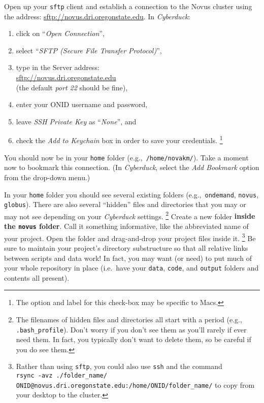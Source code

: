 \documentclass[12pt,letterpaper]{article}
\begin{document}
Open up your \texttt{sftp} client and establish a connection to the Novus cluster using the address:
\url{sftp://novus.dri.oregonstate.edu}.
In \emph{Cyberduck}:
\begin{enumerate}
	\item click on ``\emph{Open Connection}'',
	\item select ``\emph{SFTP (Secure File Transfer Protocol)}'',
	\item type in the Server address:\\
	\url{sftp://novus.dri.oregonstate.edu}\\
	(the default \emph{port 22} should be fine),
	\item enter your ONID username and password,
	\item leave \emph{SSH Private Key} as ``\emph{None}'', and
	\item check the \emph{Add to Keychain} box in order to save your credentials.
	\unskip\footnote{The option and label for this check-box may be specific to Macs.}
\end{enumerate}
\noindent
You should now be in your \texttt{home} folder (e.g.,~\texttt{/home/novakm/}).
Take a moment now to bookmark this connection.
(In \emph{Cyberduck}, select the \emph{Add Bookmark} option from the drop-down menu.)

In your \texttt{home} folder you should see several existing folders (e.g.,~\texttt{ondemand}, \texttt{novus}, \texttt{globus}).
There are also several ``hidden'' files and directories that you may or may not see depending on your \textit{Cyberduck} settings.
\unskip
\footnote{The filenames of hidden files and directories all start with a period (e.g., \texttt{.bash\_profile}).
Don't worry if you don't see them as you'll rarely if ever need them.  
In fact, you typically don't want to delete them, so be careful if you do see them.}
Create a new folder \textbf{inside the \texttt{novus} folder}.
Call it something informative, like the abbreviated name of your project.
Open the folder and drag-and-drop your project files inside it.
\unskip
\footnote{Rather than using \texttt{sftp}, 
	you could also use \texttt{ssh} and the command \\
		\texttt{rsync -avz ./{folder\_name}/ ONID@novus.dri.oregonstate.edu:/home/ONID/{folder\_name}/}
	to copy from your desktop to the cluster.}
Be sure to maintain your project's directory substructure so that all relative links between scripts and data work!
In fact, you may want (or need) to put much of your whole repository in place (i.e.~have your \texttt{data}, \texttt{code}, and \texttt{output} folders and contents all present).
\end{document}
